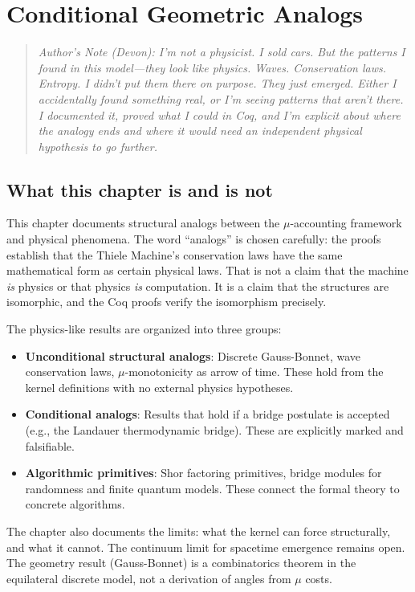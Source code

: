 \section{Conditional Geometric Analogs}

\begin{quote}
\textit{Author's Note (Devon): I'm not a physicist. I sold cars. But the patterns I found in this model---they look like physics. Waves. Conservation laws. Entropy. I didn't put them there on purpose. They just emerged. Either I accidentally found something real, or I'm seeing patterns that aren't there. I documented it, proved what I could in Coq, and I'm explicit about where the analogy ends and where it would need an independent physical hypothesis to go further.}
\end{quote}

\subsection{What this chapter is and is not}

This chapter documents structural analogs between the $\mu$-accounting framework and physical phenomena. The word ``analogs'' is chosen carefully: the proofs establish that the Thiele Machine's conservation laws have the same mathematical form as certain physical laws. That is not a claim that the machine \emph{is} physics or that physics \emph{is} computation. It is a claim that the structures are isomorphic, and the Coq proofs verify the isomorphism precisely.

The physics-like results are organized into three groups:
\begin{itemize}
    \item \textbf{Unconditional structural analogs}: Discrete Gauss-Bonnet, wave conservation laws, $\mu$-monotonicity as arrow of time. These hold from the kernel definitions with no external physics hypotheses.
    \item \textbf{Conditional analogs}: Results that hold if a bridge postulate is accepted (e.g., the Landauer thermodynamic bridge). These are explicitly marked and falsifiable.
    \item \textbf{Algorithmic primitives}: Shor factoring primitives, bridge modules for randomness and finite quantum models. These connect the formal theory to concrete algorithms.
\end{itemize}

The chapter also documents the limits: what the kernel can force structurally, and what it cannot. The continuum limit for spacetime emergence remains open. The geometry result (Gauss-Bonnet) is a combinatorics theorem in the equilateral discrete model, not a derivation of angles from $\mu$ costs.

